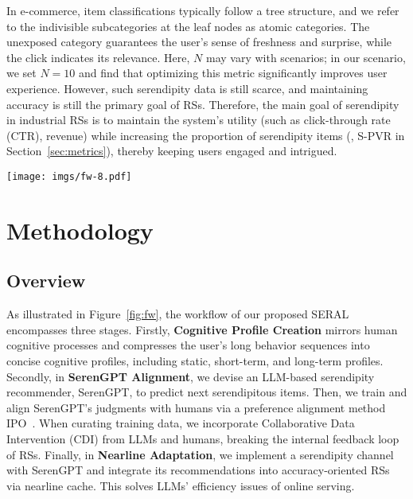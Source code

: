 In e-commerce, item classifications typically follow a tree structure, and we refer to the indivisible subcategories at the leaf nodes as atomic categories. The unexposed category guarantees the user's sense of freshness and surprise, while the click indicates its relevance. Here, $N$ may vary with scenarios; in our scenario, we set $N=10$ and find that optimizing this metric significantly improves user experience. However, such serendipity data is still scarce, and maintaining accuracy is still the primary goal of RSs. Therefore, the main goal of serendipity in industrial RSs is to maintain the system's utility (such as click-through rate (CTR), revenue) while increasing the proportion of serendipity items (\ie, S-PVR in Section~\ref{sec:metrics}), thereby keeping users engaged and intrigued. 

\begin{figure*}
    \centering
    \vspace{-10pt}
    \texttt{[image: imgs/fw-8.pdf]}
    \vspace{-15pt}
    \caption{The overall framework of SERAL, with Cognitive Profile Generation to compresses long behavior sequences into concise profiles, SerenGPT Alignment to align LLMs' serendipity judgments with humans, and Nearline Adaptation to integrate serenGPT into industrial recommender systems efficiently.}
    \vspace{-10pt}
    \label{fig:fw}
\end{figure*}

\section{Methodology}
\subsection{Overview}
As illustrated in Figure~\ref{fig:fw}, the workflow of our proposed SERAL encompasses three stages. Firstly, \textbf{Cognitive Profile Creation} mirrors human cognitive processes and compresses the user's long behavior sequences into concise cognitive profiles, including static, short-term, and long-term profiles. Secondly, in \textbf{SerenGPT Alignment}, we devise an LLM-based serendipity recommender, SerenGPT, to predict next serendipitous items. Then, we train and align SerenGPT's judgments with humans via a preference alignment method IPO~\cite{azar2024general}. When curating training data, we incorporate Collaborative Data Intervention (CDI) from LLMs and humans, breaking the internal feedback loop of RSs. Finally, in \textbf{Nearline Adaptation}, we implement a serendipity channel with SerenGPT and integrate its recommendations into accuracy-oriented RSs via nearline cache. This solves LLMs' efficiency issues of online serving.



